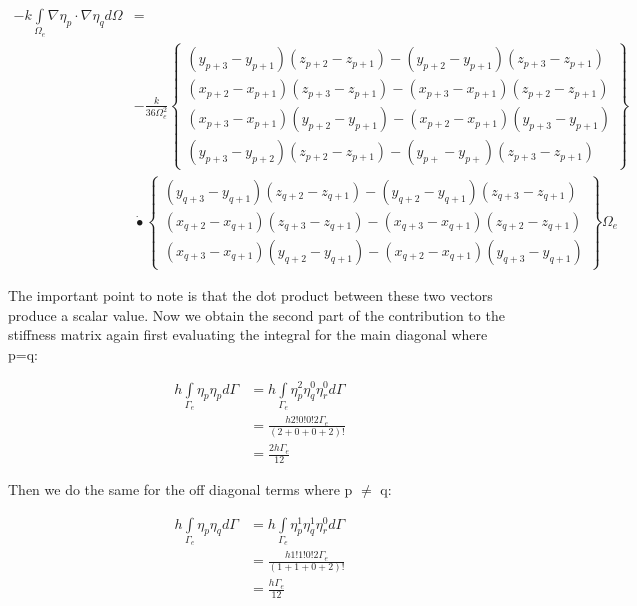 \documentclass[12pt]{article}
\begin{document}
\begin{equation}
\begin{aligned}
-k\int\limits_{\Omega_e} \nabla \eta_p \cdot \nabla \eta_q d\Omega &= \\
 & -\frac{k}{36\Omega_e^2} 
 \begin{Bmatrix} 
 (y_{p+3}-y_{p+1})(z_{p+2}-z_{p+1})-(y_{p+2}-y_{p+1})(z_{p+3}-z_{p+1}) \\
 (x_{p+2}-x_{p+1})(z_{p+3}-z_{p+1})-(x_{p+3}-x_{p+1})(z_{p+2}-z_{p+1}) \\
 (x_{p+3}-x_{p+1})(y_{p+2}-y_{p+1})-(x_{p+2}-x_{p+1})(y_{p+3}-y_{p+1}) \\
 (y_{p+3}-y_{p+2})(z_{p+2}-z_{p+1})-(y_{p+}-y_{p+})(z_{p+3}-z_{p+1})
 \end{Bmatrix} \\
 &\dot{•} 
 \begin{Bmatrix} 
 (y_{q+3}-y_{q+1})(z_{q+2}-z_{q+1})-(y_{q+2}-y_{q+1})(z_{q+3}-z_{q+1}) \\
 (x_{q+2}-x_{q+1})(z_{q+3}-z_{q+1})-(x_{q+3}-x_{q+1})(z_{q+2}-z_{q+1}) \\
 (x_{q+3}-x_{q+1})(y_{q+2}-y_{q+1})-(x_{q+2}-x_{q+1})(y_{q+3}-y_{q+1})
 \end{Bmatrix} {\Omega_e}
\end{aligned}
\end{equation}

The important point to note is that the dot product between these two vectors
produce a scalar value. Now we obtain the second part of the contribution to the stiffness matrix again first evaluating the integral for the main diagonal where p=q:

\begin{align*}
 h \int\limits_{\Gamma_e} \eta_p \eta_p d\Gamma & = 
 h\int\limits_{\Gamma_e} \eta_p^2 \eta_q^0 \eta_r^0  d{\Gamma} \\
 & = \frac{h 2!0!0!2\Gamma_e}{(2+0+0+2)!} \\
 & = \frac{2h\Gamma_e}{12}
\end{align*}

Then we do the same for the off diagonal terms where p $\neq$ q:

\begin{align*}
 h \int\limits_{\Gamma_e} \eta_p \eta_q d\Gamma & = 
 h\int\limits_{\Gamma_e} \eta_p^1 \eta_q^1 \eta_r^0  d{\Gamma} \\
 & = \frac{h 1!1!0!2\Gamma_e}{(1+1+0+2)!} \\
 & = \frac{h\Gamma_e}{12}
\end{align*}
\end{document}
